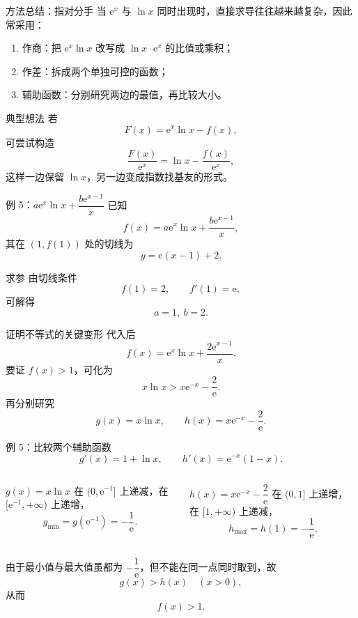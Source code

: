 ﻿\documentclass[aspectratio=169,11pt]{ctexbeamer}
\newcommand{\e}{\mathrm{e}}
\begin{document}
\begin{frame}{方法总结：指对分手}
\small
当 $\e^x$ 与 $\ln x$ 同时出现时，直接求导往往越来越复杂，因此常采用：

\begin{enumerate}
  \item 作商：把 $\e^x\ln x$ 改写成 $\ln x\cdot \e^x$ 的比值或乘积；
  \item 作差：拆成两个单独可控的函数；
  \item 辅助函数：分别研究两边的最值，再比较大小。
\end{enumerate}

\begin{block}{典型想法}
若
\[
F(x)=\e^x\ln x-f(x),
\]
可尝试构造
\[
\frac{F(x)}{\e^x}=\ln x-\frac{f(x)}{\e^x},
\]
这样一边保留 $\ln x$，另一边变成指数找基友的形式。
\end{block}
\end{frame}

\begin{frame}[allowframebreaks]{例 5：$a\e^x\ln x+\dfrac{b\e^{x-1}}{x}$}
\small
已知
\[
f(x)=a\e^x\ln x+\frac{b\e^{x-1}}{x},
\]
其在 $(1,f(1))$ 处的切线为
\[
y=\e(x-1)+2.
\]

\begin{block}{求参}
由切线条件
\[
f(1)=2,\qquad f'(1)=\e,
\]
可解得
\[
\boxed{a=1,\ b=2}.
\]
\end{block}

\pause
\begin{alertblock}{证明不等式的关键变形}
代入后
\[
f(x)=\e^x\ln x+\frac{2\e^{x-1}}{x}.
\]
要证 $f(x)>1$，可化为
\[
x\ln x>x\e^{-x}-\frac2{\e}.
\]
再分别研究
\[
g(x)=x\ln x,\qquad h(x)=x\e^{-x}-\frac2{\e}.
\]
\end{alertblock}
\end{frame}

\begin{frame}{例 5：比较两个辅助函数}
\small
\[
g'(x)=1+\ln x,\qquad h'(x)=\e^{-x}(1-x).
\]

\begin{columns}[t]
\begin{block}{$g(x)=x\ln x$}
在 $(0,\e^{-1}]$ 上递减，在 $[\e^{-1},+\infty)$ 上递增，
\[
g_{\min}=g(\e^{-1})=-\frac1{\e}.
\]
\end{block}

\begin{block}{$h(x)=x\e^{-x}-\dfrac2{\e}$}
在 $(0,1]$ 上递增，在 $[1,+\infty)$ 上递减，
\[
h_{\max}=h(1)=-\frac1{\e}.
\]
\end{block}
\end{columns}

\vspace{0.4em}
由于最小值与最大值虽都为 $-\dfrac1{\e}$，但不能在同一点同时取到，故
\[
g(x)>h(x)\quad (x>0),
\]
从而
\[
\boxed{f(x)>1}.
\]
\end{frame}
\end{document}
